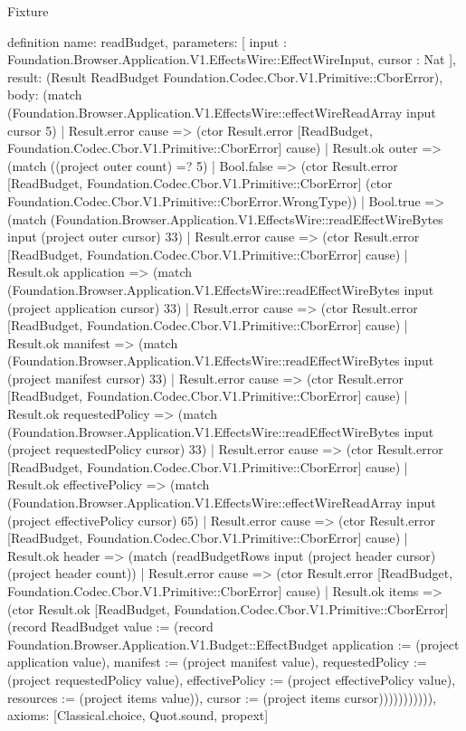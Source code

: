 \begin{lexlean}{Fixture}
\begin{semanticmodule}
definition{
  name: readBudget,
  parameters: [
    input : Foundation.Browser.Application.V1.EffectsWire::EffectWireInput,
    cursor : Nat
  ],
  result: (Result ReadBudget Foundation.Codec.Cbor.V1.Primitive::CborError),
  body: (match (Foundation.Browser.Application.V1.EffectsWire::effectWireReadArray input cursor 5)
    | Result.error cause => (ctor Result.error [ReadBudget, Foundation.Codec.Cbor.V1.Primitive::CborError] cause)
    | Result.ok outer => (match ((project outer count) =? 5)
      | Bool.false => (ctor Result.error [ReadBudget, Foundation.Codec.Cbor.V1.Primitive::CborError] (ctor Foundation.Codec.Cbor.V1.Primitive::CborError.WrongType))
      | Bool.true => (match (Foundation.Browser.Application.V1.EffectsWire::readEffectWireBytes input (project outer cursor) 33)
        | Result.error cause => (ctor Result.error [ReadBudget, Foundation.Codec.Cbor.V1.Primitive::CborError] cause)
        | Result.ok application => (match (Foundation.Browser.Application.V1.EffectsWire::readEffectWireBytes input (project application cursor) 33)
          | Result.error cause => (ctor Result.error [ReadBudget, Foundation.Codec.Cbor.V1.Primitive::CborError] cause)
          | Result.ok manifest => (match (Foundation.Browser.Application.V1.EffectsWire::readEffectWireBytes input (project manifest cursor) 33)
            | Result.error cause => (ctor Result.error [ReadBudget, Foundation.Codec.Cbor.V1.Primitive::CborError] cause)
            | Result.ok requestedPolicy => (match (Foundation.Browser.Application.V1.EffectsWire::readEffectWireBytes input (project requestedPolicy cursor) 33)
              | Result.error cause => (ctor Result.error [ReadBudget, Foundation.Codec.Cbor.V1.Primitive::CborError] cause)
              | Result.ok effectivePolicy => (match (Foundation.Browser.Application.V1.EffectsWire::effectWireReadArray input (project effectivePolicy cursor) 65)
                | Result.error cause => (ctor Result.error [ReadBudget, Foundation.Codec.Cbor.V1.Primitive::CborError] cause)
                | Result.ok header => (match (readBudgetRows input (project header cursor) (project header count))
                  | Result.error cause => (ctor Result.error [ReadBudget, Foundation.Codec.Cbor.V1.Primitive::CborError] cause)
                  | Result.ok items => (ctor Result.ok [ReadBudget, Foundation.Codec.Cbor.V1.Primitive::CborError] (record ReadBudget {value := (record Foundation.Browser.Application.V1.Budget::EffectBudget {application := (project application value), manifest := (project manifest value), requestedPolicy := (project requestedPolicy value), effectivePolicy := (project effectivePolicy value), resources := (project items value)}), cursor := (project items cursor)})))))))))),
  axioms: [Classical.choice, Quot.sound, propext]
}


\end{semanticmodule}
\end{lexlean}
